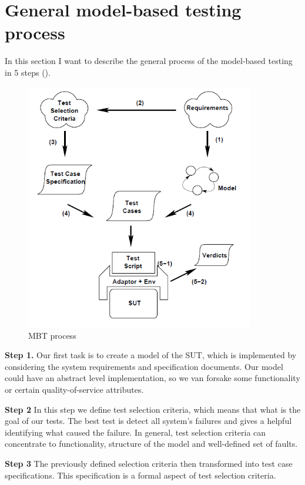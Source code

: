 \section{General model-based testing process}

In this section I want to describe the general process of the model-based testing in 5 steps (). 

\begin{figure}[!ht]
	\centering
	\includegraphics[width=100mm, keepaspectratio]{figures/MBTprocess.png}
	\caption{MBT process}
	\label{fig:mbtprocess}
\end{figure}

\textbf{Step 1.}
Our first task is to create a model of the SUT, which is implemented by considering the system requirements and specification documents. Our model could have an abstract level implementation, so we van forsake some functionality or certain quality-of-service attributes.

\textbf{Step 2}
In this step we define test selection criteria, which means that what is the goal of our tests. The best test is detect all system's failures and gives a helpful identifying what caused the failure. In general, test selection criteria can concentrate to functionality, structure of the model and well-defined set of faults.

\textbf{Step 3}
The previously defined selection criteria then transformed into test case specifications. This specification is a formal aspect of test selection criteria. 

